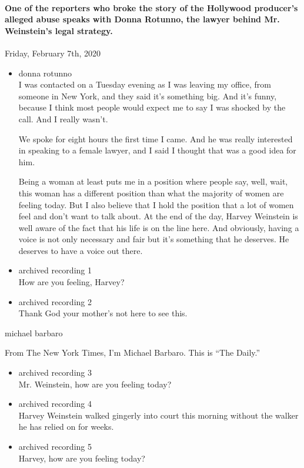 \hypertarget{one-of-the-reporters-who-broke-the-story-of-the-hollywood-producers-alleged-abuse-speaks-with-donna-rotunno-the-lawyer-behind-mr-weinsteins-legal-strategy}{%
\paragraph{One of the reporters who broke the story of the Hollywood
producer's alleged abuse speaks with Donna Rotunno, the lawyer behind
Mr. Weinstein's legal
strategy.}\label{one-of-the-reporters-who-broke-the-story-of-the-hollywood-producers-alleged-abuse-speaks-with-donna-rotunno-the-lawyer-behind-mr-weinsteins-legal-strategy}}

Friday, February 7th, 2020

\begin{itemize}
\item
  donna rotunno\\
  I was contacted on a Tuesday evening as I was leaving my office, from
  someone in New York, and they said it's something big. And it's funny,
  because I think most people would expect me to say I was shocked by
  the call. And I really wasn't.

  We spoke for eight hours the first time I came. And he was really
  interested in speaking to a female lawyer, and I said I thought that
  was a good idea for him.

  Being a woman at least puts me in a position where people say, well,
  wait, this woman has a different position than what the majority of
  women are feeling today. But I also believe that I hold the position
  that a lot of women feel and don't want to talk about. At the end of
  the day, Harvey Weinstein is well aware of the fact that his life is
  on the line here. And obviously, having a voice is not only necessary
  and fair but it's something that he deserves. He deserves to have a
  voice out there.
\item
  archived recording 1\\
  How are you feeling, Harvey?
\item
  archived recording 2\\
  Thank God your mother's not here to see this.
\end{itemize}

michael barbaro

From The New York Times, I'm Michael Barbaro. This is ``The Daily.''

\begin{itemize}
\item
  archived recording 3\\
  Mr. Weinstein, how are you feeling today?
\item
  archived recording 4\\
  Harvey Weinstein walked gingerly into court this morning without the
  walker he has relied on for weeks.
\item
  archived recording 5\\
  Harvey, how are you feeling today?
\end{itemize}

